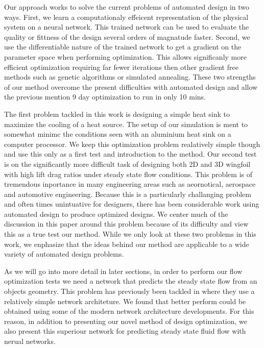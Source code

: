 \documentclass{article} %
\begin{document}
Our approach works to solve the current problems of automated design in two ways. First, we learn a computationaly effeicent representation of the physical system on a neural network. This trained network can be used to evaluate the quality or fittness of the design several orders of magnatude faster. Second, we use the differentiable nature of the trained network to get a gradient on the parameter space when performing optimization. This allows significanly more efficient optimization requiring far fewer iterations then other gradient free methods such as genetic algorithms or simulated annealing. These two strengths of our method overcome the present difficulties with automated design and allow the previous mention 9 day optimization to run in only 10 mins. 

The first problem tackled in this work is designing a simple heat sink to maximize the cooling of a heat source. The setup of our simulation is ment to somewhat minimc the conditions seen with an aluminium heat sink on a computer processor. We keep this optimization problem realatively simple though and use this only as a first test and introduction to the method. Our second test is on the significantly more difficult task of designing both 2D and 3D wingfoil with high lift drag ratios under steady state flow conditions. This problem is of tremendous inportance in many engineering areas such as aeornotical, aerospace and automotive engineering. Because this is a particularly challanging problem and often times unintuative for designers, there has been considerable work using automated design to produce optimized designs. We center much of the discussion in this paper around this problem because of its difficulty and view this as a true test our method. While we only look at these two problems in this work, we enphasize that the ideas behind our method are applicable to a wide variety of automated design problems.

As we will go into more detail in later sections, in order to perform our flow optimization tests we need a network that predicts the steady state flow from an objects geometry. This problem has previously been tackled in \citep{guo2016convolutional} where they use a relatively simple network architeture. We found that better perform could be obtained using some of the modern network architecture developments. For this reason, in addition to presenting our novel method of design optimization, we also present this superiour network for predicting steady state fluid flow with nerual networks.
\end{document}
